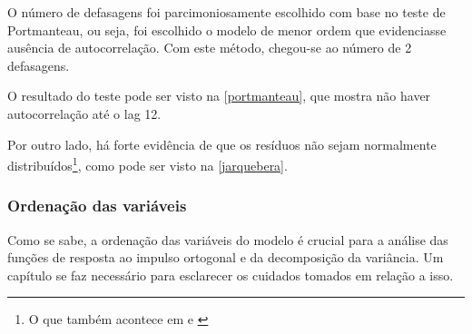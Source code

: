\documentclass[a4paper,
               article,
               12pt,
               openany,
               oneside,
               english,
               brazil]{abntex2}
\numberwithin{equation}{section}
\begin{document}
    O número de defasagens foi parcimoniosamente escolhido com base no teste de Portmanteau, ou seja, foi escolhido o modelo de menor ordem que evidenciasse ausência de autocorrelação. Com este método, chegou-se ao número de 2 defasagens.

    O resultado do teste pode ser visto na \autoref{portmanteau}, que mostra não haver autocorrelação até o lag 12.

    \begin{table}[!hbt]
    \end{table}

    Por outro lado, há forte evidência de que os resíduos não sejam normalmente distribuídos\footnote{O que também acontece em \textcite{chaim} e \textcite{oreiro}}, como pode ser visto na \autoref{jarquebera}.

    \begin{table}[!hbt]
    \end{table}

    \subsubsection{Ordenação das variáveis}

    Como se sabe, a ordenação das variáveis do modelo é crucial para a análise das funções de resposta ao impulso ortogonal e da decomposição da variância. Um capítulo se faz necessário para esclarecer os cuidados tomados em relação a isso.
\end{document}
